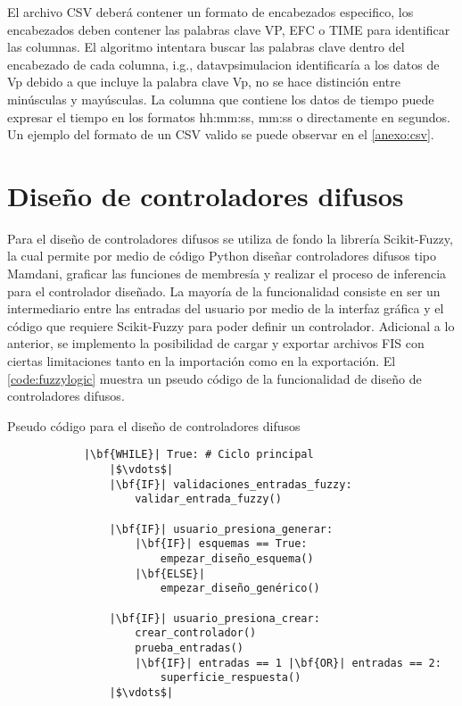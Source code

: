         El archivo CSV deberá contener un formato de encabezados especifico, los encabezados deben contener las palabras clave VP, EFC o TIME para identificar las columnas. El algoritmo intentara buscar las palabras clave dentro del encabezado de cada columna, i.g., datavpsimulacion identificaría a los datos de Vp debido a que incluye la palabra clave Vp, no se hace distinción entre minúsculas y mayúsculas. La columna que contiene los datos de tiempo puede expresar el tiempo en los formatos hh:mm:ss, mm:ss o directamente en segundos. Un ejemplo del formato de un CSV valido se puede observar en el \ref{anexo:csv}.

\section{Diseño de controladores difusos}
    
    Para el diseño de controladores difusos se utiliza de fondo la librería Scikit-Fuzzy, la cual permite por medio de código Python diseñar controladores difusos tipo Mamdani, graficar las funciones de membresía y realizar el proceso de inferencia para el controlador diseñado. La mayoría de la funcionalidad consiste en ser un intermediario entre las entradas del usuario por medio de la interfaz gráfica y el código que requiere Scikit-Fuzzy para poder definir un controlador. Adicional a lo anterior, se implemento la posibilidad de cargar y exportar archivos FIS con ciertas limitaciones tanto en la importación como en la exportación. El \cref{code:fuzzylogic} muestra un pseudo código de la funcionalidad de diseño de controladores difusos.
    
    \pagebreak

    \begin{longlisting}
        \caption[Pseudo código - Diseño de controladores difusos]{Pseudo código para el diseño de controladores difusos}
        \label{code:fuzzylogic}				
        \begin{verbatim}
            |\bf{WHILE}| True: # Ciclo principal
                |$\vdots$|
                |\bf{IF}| validaciones_entradas_fuzzy:
                    validar_entrada_fuzzy()
                
                |\bf{IF}| usuario_presiona_generar:
                    |\bf{IF}| esquemas == True:
                        empezar_diseño_esquema()
                    |\bf{ELSE}|
                        empezar_diseño_genérico()
                
                |\bf{IF}| usuario_presiona_crear:
                    crear_controlador()
                    prueba_entradas()
                    |\bf{IF}| entradas == 1 |\bf{OR}| entradas == 2:
                        superficie_respuesta()
                |$\vdots$|
        \end{verbatim}
    \end{longlisting}
    
